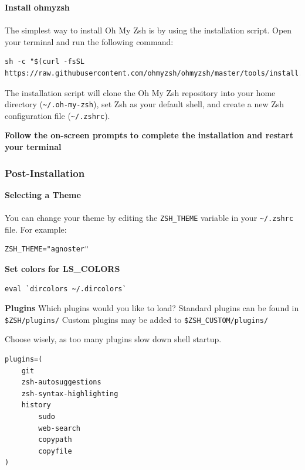 \documentclass{article}
\newenvironment{blocktemplate}[1]{%
    \tcolorbox[beamer,%
    noparskip,breakable,
    colframe=Blue,%
    colbacklower=LimeGreen!75!LightGreen,%
    title=#1]}%
    {\endtcolorbox}
\newenvironment{codetemplate}[1][]{%
  \mybasecolorbox[#1]
  \itshape
}{%
  \endmybasecolorbox
}
\begin{document}
\textbf{Install ohmyzsh}
\\\\
The simplest way to install Oh My Zsh is by using the installation script. Open your terminal and run the following command:
\begin{codetemplate}
\begin{verbatim}
sh -c "$(curl -fsSL https://raw.githubusercontent.com/ohmyzsh/ohmyzsh/master/tools/install.sh)"
\end{verbatim}
\end{codetemplate}

The installation script will clone the Oh My Zsh repository into your home directory (\verb|~/.oh-my-zsh|), set Zsh as your default shell, and create a new Zsh configuration file (\verb|~/.zshrc|).

\textbf{Follow the on-screen prompts to complete the installation and restart your terminal}

\subsubsection{Post-Installation}

\textbf{Selecting a Theme}
\\\\
You can change your theme by editing the \verb|ZSH_THEME| variable in your \verb|~/.zshrc| file. For example:
\begin{codetemplate}
\begin{verbatim}
ZSH_THEME="agnoster"
\end{verbatim}
\end{codetemplate}

\textbf{Set colors for LS\_COLORS}
\begin{codetemplate}
\begin{verbatim}
eval `dircolors ~/.dircolors`
\end{verbatim}
\end{codetemplate}

\textbf{Plugins}
Which plugins would you like to load? Standard plugins can be found in \verb|$ZSH/plugins/|
Custom plugins may be added to \verb|$ZSH_CUSTOM/plugins/|

\begin{blocktemplate}{NOTE}
Choose wisely, as too many plugins slow down shell startup.
\end{blocktemplate}

\begin{codetemplate}
\begin{verbatim}
plugins=(
    git
    zsh-autosuggestions
    zsh-syntax-highlighting
    history
        sudo
        web-search
        copypath
        copyfile
)
\end{verbatim}
\end{codetemplate}
\end{document}
